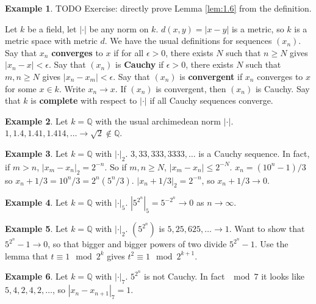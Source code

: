 \documentclass{article}
\newcommand{\Q}{\mathbb{Q}}
\newcommand{\rb}[1]{\left( #1 \right)}
\newcommand{\abs}[1]{\left\lvert #1 \right\rvert}
\theoremstyle{definition}\newtheorem{definition}{Definition}[section]
\theoremstyle{definition}\newtheorem{remark}[definition]{Remark}
\theoremstyle{definition}\newtheorem*{example}{Example}
\theoremstyle{definition}\newtheorem*{note}{Note}
\begin{document}
\begin{example}
TODO Exercise: directly prove Lemma \ref{lem:1.6} from the definition.
\end{example}

Let $ k $ be a field, let $ \abs{\cdot} $ be any norm on $ k $. $ d\rb{x, y} = \abs{x - y} $ is a metric, so $ k $ is a metric space with metric $ d $. We have the usual definitions for sequences $ \rb{x_n} $. Say that $ x_n $ \textbf{converges} to $ x $ if for all $ \epsilon > 0 $, there exists $ N $ such that $ n \ge N $ gives $ \abs{x_n - x} < \epsilon $. Say that $ \rb{x_n} $ is \textbf{Cauchy} if $ \epsilon > 0 $, there exists $ N $ such that $ m, n \ge N $ gives $ \abs{x_n - x_m} < \epsilon $. Say that $ \rb{x_n} $ is \textbf{convergent} if $ x_n $ converges to $ x $ for some $ x \in k $. Write $ x_n \to x $. If $ \rb{x_n} $ is convergent, then $ \rb{x_n} $ is Cauchy. Say that $ k $ is \textbf{complete} with respect to $ \abs{\cdot} $ if all Cauchy sequences converge.

\begin{example}
Let $ k = \Q $ with the usual archimedean norm $ \abs{\cdot} $. $ 1, 1.4, 1.41, 1.414, \dots \to \sqrt{2} \notin \Q $.
\end{example}

\begin{example}
Let $ k = \Q $ with $ \abs{\cdot}_2 $. $ 3, 33, 333, 3333, \dots $ is a Cauchy sequence. In fact, if $ m > n $, $ \abs{x_m - x_n}_2 = 2^{-n} $. So if $ m, n \ge N $, $ \abs{x_m - x_n} \le 2^{-N} $. $ x_n = \rb{10^n - 1} / 3 $ so $ x_n + 1 / 3 = 10^n / 3 = 2^n\rb{5^n / 3} $. $ \abs{x_n + 1 / 3}_2 = 2^{-n} $, so $ x_n + 1 / 3 \to 0 $.
\end{example}

\begin{example}
Let $ k = \Q $ with $ \abs{\cdot}_5 $. $ \abs{5^{2^n}}_5 = 5^{-2^n} \to 0 $ as $ n \to \infty $.
\end{example}

\begin{example}
Let $ k = \Q $ with $ \abs{\cdot}_2 $. $ \rb{5^{2^n}} $ is $ 5, 25, 625, \dots \to 1 $. Want to show that $ 5^{2^n} - 1 \to 0 $, so that bigger and bigger powers of two divide $ 5^{2^n} - 1 $. Use the lemma that $ t \equiv 1 \mod 2^k $ gives $ t^2 \equiv 1 \mod 2^{k + 1} $.
\end{example}

\begin{example}
Let $ k = \Q $ with $ \abs{\cdot}_7 $. $ 5^{2^n} $ is not Cauchy. In fact $ \mod 7 $ it looks like $ 5, 4, 2, 4, 2, \dots $, so $ \abs{x_n - x_{n + 1}}_7 = 1 $.
\end{example}
\end{document}
